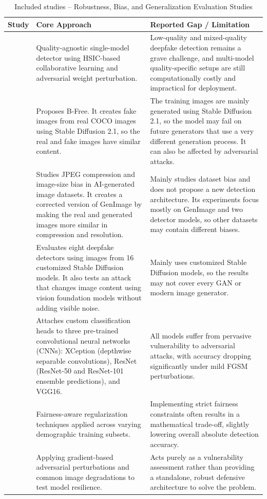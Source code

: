 \documentclass[sn-mathphys-num,Numbered,pdflatex]{sn-jnl}
\begin{document}
\begin{table}[htbp]
\caption{Included studies -- Robustness, Bias, and Generalization Evaluation Studies}
\label{tab:robustness_bias}
\centering\footnotesize
\begin{tabularx}{\columnwidth}{@{}p{} X X@{}}
\toprule
\textbf{Study} & \textbf{Core Approach} & \textbf{Reported Gap / Limitation} \\
\midrule
\cite{QualityagnosticDeepfake8} & Quality-agnostic single-model detector using HSIC-based collaborative learning and adversarial weight perturbation. & Low-quality and mixed-quality deepfake detection remains a grave challenge, and multi-model quality-specific setups are still computationally costly and impractical for deployment. \\
\cite{ABiasfree31} & Proposes B-Free. It creates fake images from real COCO images using Stable Diffusion 2.1, so the real and fake images have similar content. & The training images are mainly generated using Stable Diffusion 2.1, so the model may fail on future generators that use a very different generation process. It can also be affected by adversarial attacks. \\
\cite{FakeOr35} & Studies JPEG compression and image-size bias in AI-generated image datasets. It creates a corrected version of GenImage by making the real and generated images more similar in compression and resolution. & Mainly studies dataset bias and does not propose a new detection architecture. Its experiments focus mostly on GenImage and two detector models, so other datasets may contain different biases. \\
\cite{AnAnalysis36} & Evaluates eight deepfake detectors using images from 16 customized Stable Diffusion models. It also tests an attack that changes image content using vision foundation models without adding visible noise. & Mainly uses customized Stable Diffusion models, so the results may not cover every GAN or modern image generator. \\
\cite{ComprehensiveEvaluation46} & Attaches custom classification heads to three pre-trained convolutional neural networks (CNNs): XCeption (depthwise separable convolutions), ResNet (ResNet-50 and ResNet-101 ensemble predictions), and VGG16. & All models suffer from pervasive vulnerability to adversarial attacks, with accuracy dropping significantly under mild FGSM perturbations. \\
\cite{PreservingFairness62} & Fairness-aware regularization techniques applied across varying demographic training subsets. & Implementing strict fairness constraints often results in a mathematical trade-off, slightly lowering overall absolute detection accuracy. \\
\cite{AdversarialRobustness65} & Applying gradient-based adversarial perturbations and common image degradations to test model resilience. & Acts purely as a vulnerability assessment rather than providing a standalone, robust defensive architecture to solve the problem. \\
\bottomrule
\end{tabularx}
\end{table}
\FloatBarrier
\end{document}
